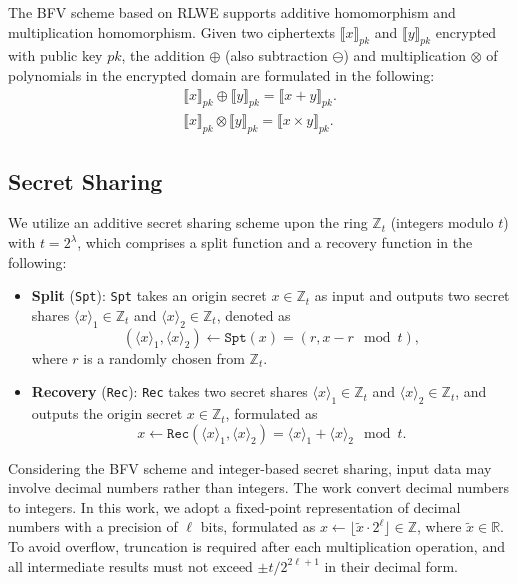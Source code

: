 \documentclass[conference]{IEEEtran}
\newcommand{\Spt}{\texttt{Spt}}
\newcommand{\Rec}{\texttt{Rec}}
\begin{document}
The BFV scheme based on RLWE supports additive homomorphism and multiplication homomorphism. Given two ciphertexts $\llbracket x \rrbracket_{pk}$ and $\llbracket y \rrbracket_{pk}$ encrypted with public key $pk$, the addition $\oplus$ (also subtraction $\ominus$) and multiplication $\otimes$ of polynomials in the encrypted domain are formulated in the following:
\begin{equation*}
\begin{array}{c}
    \llbracket x \rrbracket_{pk} \oplus \llbracket y \rrbracket_{pk} = \llbracket x + y \rrbracket_{pk}. \\
    \llbracket x \rrbracket_{pk} \otimes \llbracket y \rrbracket_{pk} = \llbracket x \times y \rrbracket_{pk}.    
\end{array}
\end{equation*}

\subsection{Secret Sharing}\label{SS}
We utilize an additive secret sharing scheme upon the ring $\mathbb{Z}_t$ (integers modulo $t$) with $t = 2^\lambda$, which comprises a split function and a recovery function in the following:
\begin{itemize}
\item \textbf{Split} (\Spt): \texttt{Spt} takes an origin secret $x \in \mathbb{Z}_t$ as input and outputs two secret shares $\langle x \rangle_1 \in \mathbb{Z}_t$ and $\langle x \rangle_2 \in \mathbb{Z}_t$, denoted as
\begin{equation}
    (\langle x \rangle_1, \langle x \rangle_2) \gets \Spt(x) = (r, x - r\!\!\!\mod t),
\end{equation}
where $r$ is a randomly chosen from $\mathbb{Z}_t$.

\item \textbf{Recovery} (\Rec): \texttt{Rec} takes two secret shares $\langle x \rangle_1 \in \mathbb{Z}_t$ and $\langle x \rangle_2 \in \mathbb{Z}_t$, and outputs the origin secret $x \in \mathbb{Z}_t$, formulated as
\begin{equation}
     x \gets \Rec(\langle x \rangle_1, \langle x \rangle_2) = \langle x \rangle_1 + \langle x \rangle_2\!\!\!\mod t.
\end{equation}
\end{itemize}

Considering the BFV scheme and integer-based secret sharing, input data may involve decimal numbers rather than integers. The work \cite{liu2024pencilprivateextensiblecollaborative,8611203} convert decimal numbers to integers. In this work, we adopt a fixed-point representation of decimal numbers with a precision of $\ell$ bits, formulated as $x \gets \lfloor \tilde{x} \cdot 2^\ell \rfloor \in \mathbb{Z}$, where $\tilde{x} \in \mathbb{R}$. To avoid overflow, truncation is required after each multiplication operation, and all intermediate results must not exceed $\pm t/2^{2\ell + 1}$ in their decimal form.
\end{document}
